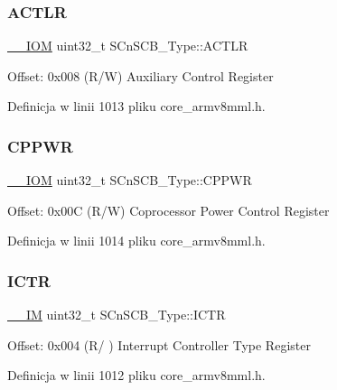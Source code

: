 \subsubsection{\texorpdfstring{A\+C\+T\+LR}{ACTLR}}
{\footnotesize\ttfamily \hyperlink{core__sc300_8h_ab6caba5853a60a17e8e04499b52bf691}{\+\_\+\+\_\+\+I\+OM} uint32\+\_\+t S\+Cn\+S\+C\+B\+\_\+\+Type\+::\+A\+C\+T\+LR}

Offset\+: 0x008 (R/W) Auxiliary Control Register 

Definicja w linii 1013 pliku core\+\_\+armv8mml.\+h.

\mbox{\label{struct_s_cn_s_c_b___type_a356efebfcbdaecaf1176e6cd86a60bf1}} 
\subsubsection{\texorpdfstring{C\+P\+P\+WR}{CPPWR}}
{\footnotesize\ttfamily \hyperlink{core__sc300_8h_ab6caba5853a60a17e8e04499b52bf691}{\+\_\+\+\_\+\+I\+OM} uint32\+\_\+t S\+Cn\+S\+C\+B\+\_\+\+Type\+::\+C\+P\+P\+WR}

Offset\+: 0x00C (R/W) Coprocessor Power Control Register 

Definicja w linii 1014 pliku core\+\_\+armv8mml.\+h.

\mbox{\label{struct_s_cn_s_c_b___type_a34ec1d771245eb9bd0e3ec9336949762}} 
\subsubsection{\texorpdfstring{I\+C\+TR}{ICTR}}
{\footnotesize\ttfamily \hyperlink{core__sc300_8h_a4cc1649793116d7c2d8afce7a4ffce43}{\+\_\+\+\_\+\+IM} uint32\+\_\+t S\+Cn\+S\+C\+B\+\_\+\+Type\+::\+I\+C\+TR}

Offset\+: 0x004 (R/ ) Interrupt Controller Type Register 

Definicja w linii 1012 pliku core\+\_\+armv8mml.\+h.

\mbox{\label{struct_s_cn_s_c_b___type_a758b3cae751b227e20698256b6249dd4}} 
